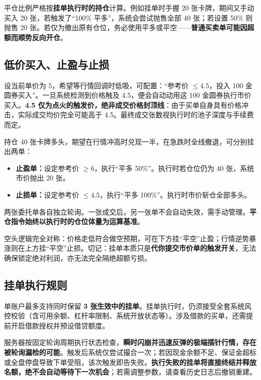 \documentclass[11pt,a4paper,twoside]{article}
\newcommand{\gold}{金圆券}
\begin{document}
平仓比例严格按\textbf{挂单执行时的持仓}计算。例如挂单时手握 20 张卡牌，期间又手动买入 20 张，若触发了“100\% 平多”，系统会尝试抛售全部 40 张；若设置 50\% 则抛售 20 张。若仅为撤出原有仓位，务必使用平多或平空——\textbf{普通买卖单可能因超额而顺势反向开仓}。
\subsection{低价买入、止盈与止损}
设当前单价为 5，希望等行情回调时低吸，可配置：“参考价 $\le 4.5$，投入 100 \gold{}买入”。一旦系统检测到价格触及 4.5，便会自动动用这 100 \gold{}执行市价买入。\textbf{4.5 仅为点火的触发价，绝非成交价格封顶线}：由于买单自身具有价格冲击，实际成交均价完全可能高于 4.5。最终成交张数视执行时的池子深度与手续费而定。

\begin{exbox}[title={例：为多头持仓配置双向防护},breakable=false]
持仓 40 张卡牌多头，期望在行情冲高时兑现一半，在急跌时全线撤退，可分别挂出两单：
\begin{itemize}
  \item \textbf{止盈单：}设定参考价 $\ge 6$，执行“平多 50\%”。执行时若仓位仍为 40 张，系统市价抛出 20 张。
  \item \textbf{止损单：}设定参考价 $\le 4.5$，执行“平多 100\%”。执行时市价斩仓全部多头。
\end{itemize}
两张委托单各自独立轮询。一张成交后，另一张单不会自动失效，需手动管理。\textbf{平仓指令始终以执行时的仓位体量为运算基准}。
\end{exbox}

空头逻辑完全对称：价格走低符合做空预期，可在下方挂“平空”止盈；行情逆势暴涨则在上方挂“平空”止损。切记：挂单本质只是\textbf{代你提交市价单的触发开关}，无法确保锁定绝对利润，亦无法完全隔绝超额亏损。

\subsection{挂单执行规则}

单账户最多支持同时保留 \textbf{3 张生效中的挂单}。挂单执行时，仍须接受全套系统风控校验（含可用余额、杠杆率限制、系统开放状态等）。涉及借款的买单，还需提前开启借款授权并预设借贷额度。

服务器按固定轮询周期执行状态检查，\textbf{瞬时闪崩并迅速反弹的极端插针行情，存在被轮询漏检的可能}。触发后系统仅尝试撮合一次；若因现金余额不足、保证金超标或全盘停盘导致下单受阻，该次触发即告失败。\textbf{执行失败的挂单将直接终结并释放名额，绝不会自动等待下一次机会}；若需调整参数，请查看历史日志后撤销重建。
\end{document}
